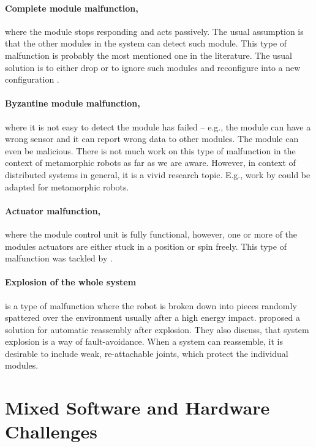\paragraph{Complete module malfunction,} where the module stops responding and
acts passively. The usual assumption is that the other modules in the system can
detect such module. This type of malfunction is probably the most mentioned one
in the literature. The usual solution is to either drop or to ignore such
modules and reconfigure into a new configuration
\cite{DBLP:conf/ieeealife/Christensen07, DMotionCoord}.

\paragraph{Byzantine module malfunction,} where it is not easy to detect the
module has failed -- e.g., the module can have a wrong sensor and it can report
wrong data to other modules. The module can even be malicious. There is not much
work on this type of malfunction in the context of metamorphic robots as far as
we are aware. However, in context of distributed systems in general, it is a
vivid research topic. E.g., work by \textcite{DBLP:conf/osdi/CastroL99} could be
adapted for metamorphic robots.

\paragraph{Actuator malfunction,} where the module control unit is fully
functional, however, one or more of the modules actuators are either stuck
in a position or spin freely. This type of malfunction was tackled by
\textcite{DBLP:conf/romoco/VonasekONW15}.

\paragraph{Explosion of the whole system} is a type of malfunction where the
robot is broken down into pieces randomly spattered over the environment usually
after a high energy impact. \textcite{DBLP:conf/iros/YimSSPDT07a} proposed a
solution for automatic reassembly after explosion. They also discuss, that
system explosion is a way of fault-avoidance. When a system can reassemble, it
is desirable to include weak, re-attachable joints, which protect the individual
modules.


\section{Mixed Software and Hardware Challenges}\label{sec:mixed-challenges}

